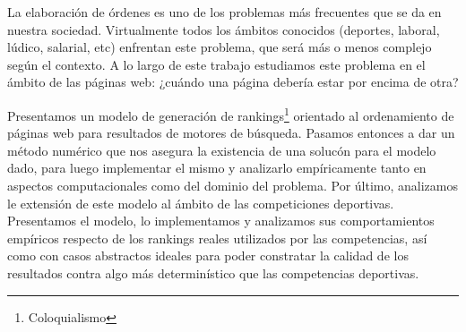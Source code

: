 La elaboraci\'on de \'ordenes es uno de los problemas m\'as frecuentes que se
da en nuestra sociedad. Virtualmente todos los \'ambitos conocidos (deportes,
laboral, l\'udico, salarial, etc) enfrentan este problema, que ser\'a m\'as o
menos complejo seg\'un el contexto. A lo largo de este trabajo estudiamos este
problema en el \'ambito de las p\'aginas web: ¿cu\'ando una p\'agina deber\'ia
estar por encima de otra?

\par Presentamos un modelo de generaci\'on de rankings\footnote{Coloquialismo}
orientado al ordenamiento de p\'aginas web para resultados de motores de
b\'usqueda. Pasamos entonces a dar un m\'etodo num\'erico que nos asegura la
existencia de una soluc\'on para el modelo dado, para luego implementar el mismo
y analizarlo emp\'iricamente tanto en aspectos computacionales como del dominio
del problema. Por \'ultimo, analizamos le extensi\'on de este modelo al \'ambito de las
competiciones deportivas. Presentamos el modelo, lo implementamos y analizamos
sus comportamientos emp\'iricos respecto de los rankings reales utilizados por
las competencias, as\'i como con casos abstractos ideales para poder constratar
la calidad de los resultados contra algo m\'as determin\'istico que las
competencias deportivas.
